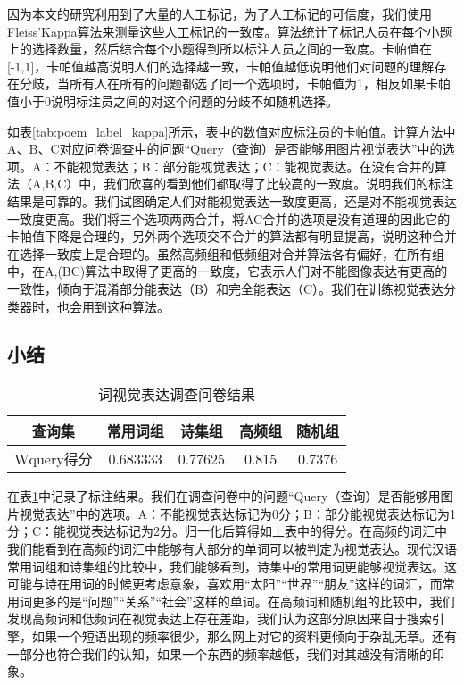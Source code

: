 因为本文的研究利用到了大量的人工标记，为了人工标记的可信度，我们使用Fleiss'Kappa算法来测量这些人工标记的一致度。算法统计了标记人员在每个小题上的选择数量，然后综合每个小题得到所以标注人员之间的一致度。卡帕值在[-1,1]，卡帕值越高说明人们的选择越一致，卡帕值越低说明他们对问题的理解存在分歧，当所有人在所有的问题都选了同一个选项时，卡帕值为1，相反如果卡帕值小于0说明标注员之间的对这个问题的分歧不如随机选择。

如表\ref{tab:poem_label_kappa}所示，表中的数值对应标注员的卡帕值。计算方法中A、B、C对应问卷调查中的问题“Query（查询）是否能够用图片视觉表达”中的选项。A：不能视觉表达；B：部分能视觉表达；C：能视觉表达。在没有合并的算法（A,B,C）中，我们欣喜的看到他们都取得了比较高的一致度。说明我们的标注结果是可靠的。我们试图确定人们对能视觉表达一致度更高，还是对不能视觉表达一致度更高。我们将三个选项两两合并，将AC合并的选项是没有道理的因此它的卡帕值下降是合理的，另外两个选项交不合并的算法都有明显提高，说明这种合并在选择一致度上是合理的。虽然高频组和低频组对合并算法各有偏好，在所有组中，在A,(BC)算法中取得了更高的一致度，它表示人们对不能图像表达有更高的一致性，倾向于混淆部分能表达（B）和完全能表达（C）。我们在训练视觉表达分类器时，也会用到这种算法。

\subsection{小结}

\begin{table}[htbp]
\centering
\caption{词视觉表达调查问卷结果} \label{tab:poem_result}
\begin{tabular}{ |c|c|c|c|c|}
    \hline
		查询集 & 常用词组 & 诗集组 &  高频组 & 随机组 \\
	\hline 
		Wquery得分 & 0.683333 & 0.77625   & 0.815 & 0.7376 \\
 	\hline
\end{tabular}
\end{table}

在表\ref{tab:poem_result}中记录了标注结果。我们在调查问卷中的问题“Query（查询）是否能够用图片视觉表达”中的选项。A：不能视觉表达标记为0分；B：部分能视觉表达标记为1分；C：能视觉表达标记为2分。归一化后算得如上表中的得分。在高频的词汇中我们能看到在高频的词汇中能够有大部分的单词可以被判定为视觉表达。现代汉语常用词组和诗集组的比较中，我们能够看到，诗集中的常用词更能够视觉表达。这可能与诗在用词的时候更考虑意象，喜欢用“太阳”“世界”“朋友”这样的词汇，而常用词更多的是“问题”“关系”“社会”这样的单词。在高频词和随机组的比较中，我们发现高频词和低频词在视觉表达上存在差距，我们认为这部分原因来自于搜索引擎，如果一个短语出现的频率很少，那么网上对它的资料更倾向于杂乱无章。还有一部分也符合我们的认知，如果一个东西的频率越低，我们对其越没有清晰的印象。






